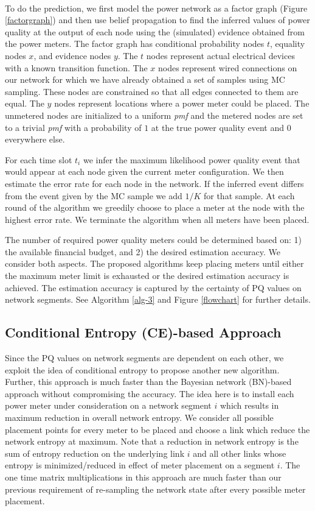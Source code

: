 \noindent \\
To do the prediction, we first model the power network as a factor graph (Figure \ref{factorgraph}) and then use belief propagation to find the inferred values of power quality at the output of each node using the (simulated) evidence obtained from the power meters. The factor graph has conditional probability nodes $t$, equality nodes $x$, and evidence nodes $y$. The $t$ nodes represent actual electrical devices with a known transition function. The $x$ nodes represent wired connections on our network for which we have already obtained a set of samples using MC sampling. These nodes are constrained so that all edges connected to them are equal. The $y$ nodes represent locations where a power meter could be placed. The unmetered nodes are initialized to a uniform \emph{pmf} and the metered nodes are set to a trivial \emph{pmf} with a probability of $1$ at the true power quality event and $0$ everywhere else. 

For each time slot $t_{i}$ we infer the maximum likelihood power
quality event that would appear at each node given the current meter
configuration. We then estimate the error rate for each node in the
network. If the inferred event differs from the event given by the
MC sample we add $1/K$ for that sample. At each round of the algorithm
we greedily choose to place a meter at the node with the highest error
rate. We terminate the algorithm when all meters have been placed.

The number of required power quality meters could be determined based on: 1) the available financial budget, and 2) the desired estimation accuracy. We consider both aspects. The proposed algorithms keep placing meters until either the maximum meter limit is exhausted or the desired estimation accuracy is achieved. The estimation accuracy is captured by the certainty of PQ values on network segments. See Algorithm \ref{alg-3} and Figure \ref{flowchart} for further details.

\subsection{Conditional Entropy (CE)-based Approach}
Since the PQ values on network segments are dependent on each other, we exploit the idea of conditional entropy to propose another new algorithm. Further, this approach is much faster than the Bayesian network (BN)-based approach without compromising the accuracy. The idea here is to install each power meter under consideration on a network segment $i$ which results in maximum reduction in overall network entropy. We consider all possible placement points for every meter to be placed and choose a link which reduce the network entropy at maximum. Note that a reduction in network entropy is the sum of entropy reduction on the underlying link $i$ and all other links whose entropy is minimized/reduced in effect of meter placement on a segment $i$. The one time matrix multiplications in this approach are much faster than our previous requirement of re-sampling the network state after every possible meter placement.

